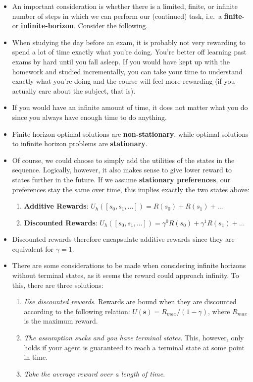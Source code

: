 \documentclass[
]{book}
\providecommand{\tightlist}{%
  \setlength{\itemsep}{0pt}\setlength{\parskip}{0pt}}
\begin{document}
\begin{itemize}
\item
  An important consideration is whether there is a limited, finite, or
  infinite number of steps in which we can perform our (continued) task,
  i.e.~a \textbf{finite-} or \textbf{infinite-horizon}. Consider the
  following.
\item
  When studying the day before an exam, it is probably not very
  rewarding to spend a lot of time exactly what you're doing. You're
  better off learning past exams by hard until you fall asleep. If you
  would have kept up with the homework and studied incrementally, you
  can take your time to understand exactly what you're doing and the
  course will feel more rewarding (if you actually care about the
  subject, that is).
\item
  If you would have an infinite amount of time, it does not matter what
  you do since you always have enough time to do anything.
\item
  Finite horizon optimal solutions are \textbf{non-stationary}, while
  optimal solutions to infinite horizon problems are
  \textbf{stationary}.
\item
  Of course, we could choose to simply add the utilities of the states
  in the sequence. Logically, however, it also makes sense to give lower
  reward to states further in the future. If we assume
  \textbf{stationary preferences}, our preferences stay the same over
  time, this implies exactly the two states above:

  \begin{enumerate}
  \def\labelenumi{\arabic{enumi}.}
  \item
    \textbf{Additive Rewards}:
    \(U_h([s_0, s_1, \ldots]) = R(s_0) + R(s_1) + \ldots\)
  \item
    \textbf{Discounted Rewards}:
    \(U_h([s_0, s_1, \dots]) = \gamma^0R(s_0) + \gamma^1R(s_1) + \ldots\)
  \end{enumerate}
\item
  Discounted rewards therefore encapsulate additive rewards since they
  are equivalent for \(\gamma = 1\).
\item
  There are some considerations to be made when considering infinite
  horizons without terminal states, as it seems the reward could
  approach infinity. To this, there are three solutions:

  \begin{enumerate}
  \def\labelenumi{\arabic{enumi}.}
  \tightlist
  \item
    \emph{Use discounted rewards}. Rewards are bound when they are
    discounted according to the following relation:
    \(U(\mathbf{s})=R_{max}/(1-\gamma)\), where \(R_{max}\) is the
    maximum reward.
  \item
    \emph{The assumption sucks and you have terminal states}. This,
    however, only holds if your agent is guaranteed to reach a terminal
    state at some point in time.
  \item
    \emph{Take the average reward over a length of time}.
  \end{enumerate}
\end{itemize}
\end{document}
